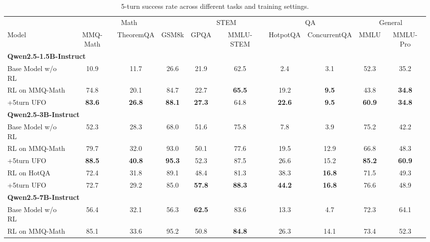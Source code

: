 \begin{table}[t]
\centering
\caption{5-turn success rate across different tasks and training settings.}
\vspace{10pt}
\scriptsize 
\setlength{\tabcolsep}{2pt}
\begin{tabular}{lccccccccc}
\toprule
& \multicolumn{3}{c}{Math} & \multicolumn{2}{c}{STEM} & \multicolumn{2}{c}{QA} & \multicolumn{2}{c}{General} \\
\cmidrule(lr){2-4} \cmidrule(lr){5-6} \cmidrule(lr){7-8} \cmidrule(lr){9-10}
Model & MMQ-Math & TheoremQA & GSM8k & GPQA & MMLU-STEM & HotpotQA & ConcurrentQA & MMLU & MMLU-Pro \\
\midrule
\multicolumn{10}{l}{\textbf{Qwen2.5-1.5B-Instruct}} \\
Base Model w/o RL            & 10.9 & 11.7 & 26.6 & 21.9 & 62.5 & 2.4 & 3.1 & 52.3 & 35.2 \\
RL on MMQ-Math               & 74.8 & 20.1 & 84.7 & 22.7 & \textbf{65.5} & 19.2 & \textbf{9.5} & 43.8 & \textbf{34.8} \\
\rowcolor{gray!15}
+5turn UFO                   & \textbf{83.6} & \textbf{26.8} & \textbf{88.1} & \textbf{27.3} & 64.8 & \textbf{22.6} & \textbf{9.5} & \textbf{60.9} & \textbf{34.8} \\
\midrule
\multicolumn{10}{l}{\textbf{Qwen2.5-3B-Instruct}} \\
Base Model w/o RL            & 52.3 & 28.3 & 68.0 & 51.6 & 75.8 & 7.8 & 3.9 & 75.2 & 42.2 \\
RL on MMQ-Math               & 79.7 & 32.0 & 93.0 & 50.1 & 77.6 & 19.5 & 12.9 & 66.8 & 48.3 \\
\rowcolor{gray!15}
+5turn UFO                   & \textbf{88.5} & \textbf{40.8} & \textbf{95.3} & 52.3 & 87.5 & 26.6 & 15.2 & \textbf{85.2} & \textbf{60.9} \\
RL on HotQA                  & 72.4 & 31.8 & 89.1 & 48.4 & 81.3 & 38.3 & \textbf{16.8} & 71.5 & 49.3 \\
\rowcolor{gray!15}
+5turn UFO                   & 72.7 & 29.2 & 85.0 & \textbf{57.8} & \textbf{88.3} & \textbf{44.2} & \textbf{16.8} & 76.6 & 48.9 \\
\midrule
\multicolumn{10}{l}{\textbf{Qwen2.5-7B-Instruct}} \\
Base Model w/o RL            & 56.4 & 32.1 & 56.3 & \textbf{62.5} & 83.6 & 13.3 & 4.7 & 72.3 & 64.1 \\
RL on MMQ-Math               & 85.1 & 33.6 & 95.2 & 50.8 & \textbf{84.8} & 26.3 & 14.1 & 73.4 & 52.3 \\

\end{tabular}
\end{table}
